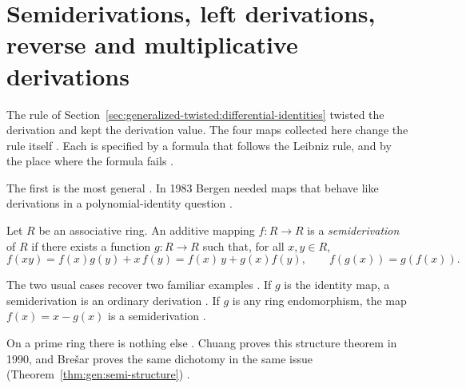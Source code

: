 \section{Semiderivations, left derivations, reverse and multiplicative derivations}\label{sec:generalized-twisted:semi-left-reverse}

The rule of Section~\ref{sec:generalized-twisted:differential-identities}
twisted the derivation and kept the derivation value. The four maps collected
here change the rule itself \cite[p.~267]{Bergen1983}. Each is specified by a
formula that follows the Leibniz rule, and by the place where the formula
fails \cite[p.~1105]{Herstein1957}.

The first is the most general \cite[p.~267]{Bergen1983}. In 1983 Bergen needed
maps that behave like derivations in a polynomial-identity question
\cite[p.~267]{Bergen1983}.

\begin{definition}\label{def:gen:semiderivation}
Let $R$ be an associative ring. An additive mapping $f\colon R\to R$ is a
\emph{semiderivation} of $R$ if there exists a function $g\colon R\to R$ such
that, for all $x,y\in R$,
\begin{equation*}
f(xy)=f(x)g(y)+x\,f(y)=f(x)\,y+g(x)f(y),
\qquad
f(g(x))=g(f(x)).
\end{equation*}
\end{definition}

The two usual cases recover two familiar examples
\cite[p.~867]{Chuang1990Semi}. If $g$ is the identity map, a semiderivation is
an ordinary derivation \cite[p.~867]{Chuang1990Semi}. If $g$ is any ring
endomorphism, the map $f(x)=x-g(x)$ is a semiderivation
\cite[p.~867]{Chuang1990Semi}.

On a prime ring there is nothing else \cite[p.~867]{Chuang1990Semi}. Chuang
proves this structure theorem in 1990, and Bre\v{s}ar proves the same
dichotomy in the same issue (Theorem~\ref{thm:gen:semi-structure}) \cite[p.~859]{Bresar1990Semi}.

